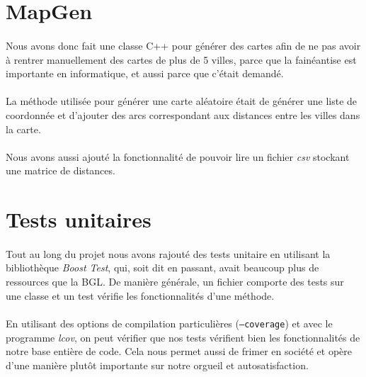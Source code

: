 \documentclass[french]{article}
\begin{document}
\section{MapGen}\label{sec:mapgen}

\paragraph{} Nous avons donc fait une classe C++ pour générer des cartes afin
de ne pas avoir à rentrer manuellement des cartes de plus de 5 villes, parce
que la fainéantise est importante en informatique, et aussi parce que c'était
demandé.

\paragraph{} La méthode utilisée pour générer une carte aléatoire était de
générer une liste de coordonnée et d'ajouter des arcs correspondant aux
distances entre les villes dans la carte.

\paragraph{} Nous avons aussi ajouté la fonctionnalité de pouvoir lire un
fichier \emph{csv} stockant une matrice de distances.

\section{Tests unitaires}

\paragraph{} Tout au long du projet nous avons rajouté des tests unitaire en
utilisant la bibliothèque \emph{Boost Test}, qui, soit dit en passant, avait
beaucoup plus de ressources que la BGL. De manière générale, un fichier
comporte des tests sur une classe et un test vérifie les fonctionnalités d'une
méthode.

\paragraph{} En utilisant des options de compilation particulières
(\texttt{--coverage}) et avec le programme \emph{lcov}, on peut vérifier que
nos tests vérifient bien les fonctionnalités de notre base entière de code.
Cela nous permet aussi de frimer en société et opère d'une manière plutôt
importante sur notre orgueil et autosatisfaction.
\end{document}
